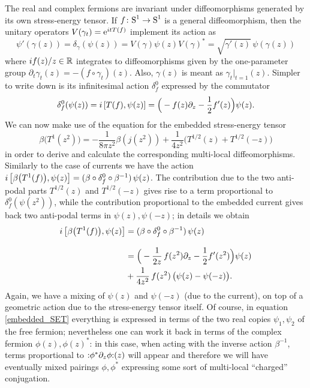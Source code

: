 \bigskip
The real and complex fermions are invariant under 
diffeomorphisms generated by its own stress-energy 
tensor. If $f\colon\textrm{S}^1\to\textrm{S}^1$ is a general diffeomorphism,
then the unitary operators $V(\gamma_t)=\operatorname{e}^{itT(f)}$ implement
its action as
\begin{equation*}
 \psi'(\gamma(z))=\delta_{\gamma}(\psi(z))=
 V(\gamma)\psi(z)V(\gamma)^*
 =\sqrt{\gamma'(z)}\,\psi(\gamma(z))
\end{equation*}
where $i f(z)/z\in\mathbb{R}$ integrates to
diffeomorphisms given by the one-parameter group 
$\partial_t\gamma_t(z)=-(f\circ\gamma_t)(z)$. 
Also, $\gamma(z)$ is meant as $\gamma_t|_{t=1}(z)$.
Simpler to write down is its 
infinitesimal action $\delta_f^0$ expressed by the 
commutator
\[
\delta_f^0(\psi(z))=i\,\comm*{T(f),\psi(z)}=
\Big(-f(z)\partial_z -\frac{1}{2}f'(z)\Big)\psi(z).
\]
We can now make use of the equation for the 
embedded stress-energy tensor 
\begin{equation}
\label{embedded_SET}
\beta\big(T^1(z^2)\big)=-\frac{1}{8\pi z^2}\beta(j(z^2))+
\frac{1}{4z^2}\big(T^{1/2}(z)+T^{1/2}(-z)\big)
\end{equation}
in order to derive and calculate the 
corresponding multi-local diffeomorphisms.
Similarly to the case of currents we have
the action
$i\,\comm*{\beta\big(T^1(f)\big),\psi(z)}=
(\beta\circ\delta_f^0\circ\beta^{-1})\,\psi(z)$.
The contribution due to the two anti-podal parts
$T^{1/2}(z)$ and $T^{1/2}(-z)$ gives rise to
a term proportional to $\delta_f^0(\psi(z^2))$, 
while the contribution proportional to the 
embedded current gives back two anti-podal terms
in $\psi(z), \psi(-z)$; in details we obtain 
\begin{align*}
i\,\comm*{\beta\big(T^1(f)\big),\psi(z)}&=
(\beta\circ\delta_f^0\circ\beta^{-1})\,\psi(z)\\[2ex]
&=\Big(-\frac{1}{2z}\,f(z^2)\partial_z -\frac{1}{2}
f'(z^2)\Big)\psi(z)\\
&+\frac{1}{4z^2}\,f(z^2)\, 
\big(\psi(z)-\psi(-z)\big).
\end{align*}
Again, we have a mixing of $\psi(z)$ and $\psi(-z)$ 
(due to the current), on top of a geometric action 
due to the stress-energy tensor itself. Of course, in
equation \eqref{embedded_SET} everything is 
expressed in terms of the two real copies 
$\psi_1,\psi_2$ of the free fermion; nevertheless 
one can work it back in terms of the complex
fermion $\phi(z),\phi(z)^*$: in this case, 
when acting with the inverse action $\beta^{-1}$, terms 
proportional to $\wick{\phi^*\partial_z\phi}(z)$
will appear and therefore we will have eventually
mixed pairings $\phi,\phi^*$ expressing some sort
of multi-local ``charged'' conjugation.

